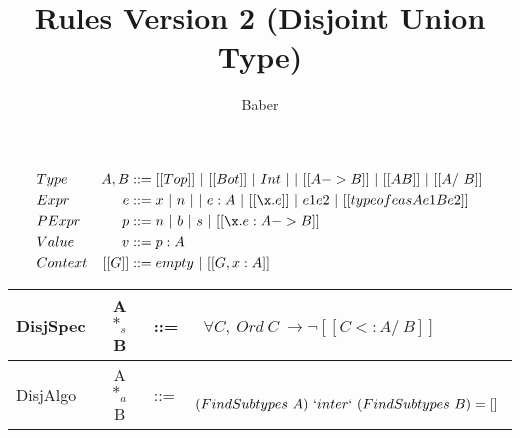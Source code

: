 \documentclass[a4paper]{article}
\title{Rules Version 2 (Disjoint Union Type)}
\author{Baber}
\begin{document}
\maketitle

\begin{align*}
&Type &A, B&::= [[Top]] ~ | ~[[Bot]]~|~ Int ~|~| ~ [[A->B]]~ |~ [[A \/ B]] ~ |~ [[A /\ B]]\\
&Expr &e &::= x ~|~ n ~| ~| ~ e:A ~|~[[\x.e]] ~ | ~ e1e2 ~|~ [[typeof e as A e1 B e2]]\\
&PExpr & p &::= n ~| ~ b ~ | ~ s ~|~ [[\x.e : A->B]] \\
&Value &v &::= p : A \\
&Context & [[G]] &::= empty~ |~ [[G , x : A]]
\end{align*}






     {\renewcommand{\arraystretch}{1.5}
     \begin{center}
     \begin{tabular}{|lcll|}
       \hline
      DisjSpec & A $*_s$ B & ::= & ~$\forall C, ~ Ord ~ C ~ \rightarrow \neg [[C <: A /\ B]]$\\
       \hline
      DisjAlgo & A $*_a$ B & ::= & ~ $(FindSubtypes ~ A) ~ `inter` ~ (FindSubtypes ~ B) = []$ \\
       \hline
     \end{tabular}
     \end{center} }
\end{document}
